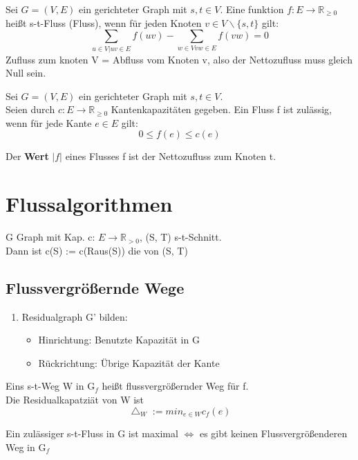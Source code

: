 \documentclass[14pt]{article}
\begin{document}
\begin{definition}[Fluss]
    Sei $G = (V, E)$ ein gerichteter Graph mit $s, t \in V$.
    Eine funktion $f : E \rightarrow \mathbb{R}_{\geq 0}$ heißt
    s-t-Fluss (Fluss), wenn für jeden Knoten $v \in V \backslash
        \{ s, t \}$ gilt:
    \[
        \sum_{u \in V | uv \in E} f(uv)
        - \sum_{w \in V vw \in E} f(vw) = 0
    \]
    Zufluss zum knoten V = Abfluss vom Knoten v, also der
    Nettozufluss muss gleich Null sein.
\end{definition}
\begin{definition}
    Sei $G = (V, E)$ ein gerichteter Graph mit $s, t \in V$. \\
    Seien durch $c: E \rightarrow \mathbb{R}_{\geq 0}$ Kantenkapazitäten
    gegeben. Ein Fluss f ist zulässig, wenn für jede Kante $e \in E$ gilt:
    \[
        0 \leq f(e) \leq c(e)
    \]
\end{definition}
Der \textbf{Wert} $|f|$ eines Flusses f ist der Nettozufluss
zum Knoten t.

\section{Flussalgorithmen}
\begin{definition}
    G Graph mit Kap. c: $E \rightarrow \mathbb{R}_{> 0}$, (S, T) s-t-Schnitt. \\
    Dann ist c(S) := c(Raus(S)) die  von (S, T)
\end{definition}

\subsection{Flussvergrößernde Wege}
\begin{enumerate}
    \item Residualgraph G' bilden:
          \begin{itemize}
              \item Hinrichtung: Benutzte Kapazität in G
              \item Rückrichtung: Übrige Kapazität der Kante
          \end{itemize}
\end{enumerate}
\begin{definition}
    Eins s-t-Weg W in G$_f$ heißt flussvergrößernder Weg für f. \\
    Die Residualkapatziät von W ist
    \[
        \bigtriangleup_W  := min_{e \in W} c_f(e)
    \]
\end{definition}
Ein zulässiger s-t-Fluss in G ist maximal $\Leftrightarrow$ es gibt
keinen Flussvergrößenderen Weg in G$_f$
\end{document}
